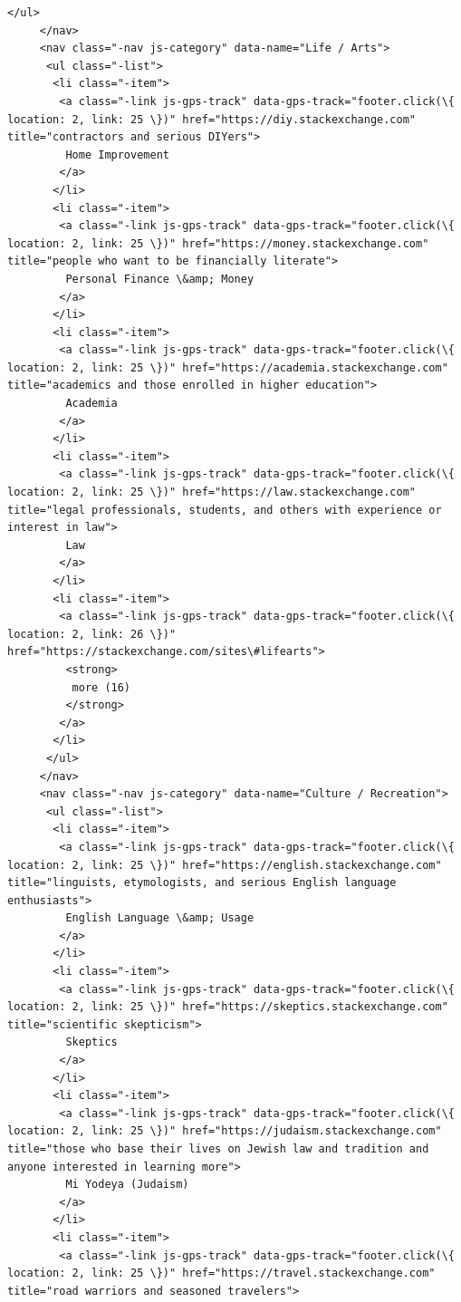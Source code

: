\documentclass[11pt]{article}
\begin{document}
\begin{Verbatim}[commandchars=\\\{\}]
      </ul>
     </nav>
     <nav class="-nav js-category" data-name="Life / Arts">
      <ul class="-list">
       <li class="-item">
        <a class="-link js-gps-track" data-gps-track="footer.click(\{ location: 2, link: 25 \})" href="https://diy.stackexchange.com" title="contractors and serious DIYers">
         Home Improvement
        </a>
       </li>
       <li class="-item">
        <a class="-link js-gps-track" data-gps-track="footer.click(\{ location: 2, link: 25 \})" href="https://money.stackexchange.com" title="people who want to be financially literate">
         Personal Finance \&amp; Money
        </a>
       </li>
       <li class="-item">
        <a class="-link js-gps-track" data-gps-track="footer.click(\{ location: 2, link: 25 \})" href="https://academia.stackexchange.com" title="academics and those enrolled in higher education">
         Academia
        </a>
       </li>
       <li class="-item">
        <a class="-link js-gps-track" data-gps-track="footer.click(\{ location: 2, link: 25 \})" href="https://law.stackexchange.com" title="legal professionals, students, and others with experience or interest in law">
         Law
        </a>
       </li>
       <li class="-item">
        <a class="-link js-gps-track" data-gps-track="footer.click(\{ location: 2, link: 26 \})" href="https://stackexchange.com/sites\#lifearts">
         <strong>
          more (16)
         </strong>
        </a>
       </li>
      </ul>
     </nav>
     <nav class="-nav js-category" data-name="Culture / Recreation">
      <ul class="-list">
       <li class="-item">
        <a class="-link js-gps-track" data-gps-track="footer.click(\{ location: 2, link: 25 \})" href="https://english.stackexchange.com" title="linguists, etymologists, and serious English language enthusiasts">
         English Language \&amp; Usage
        </a>
       </li>
       <li class="-item">
        <a class="-link js-gps-track" data-gps-track="footer.click(\{ location: 2, link: 25 \})" href="https://skeptics.stackexchange.com" title="scientific skepticism">
         Skeptics
        </a>
       </li>
       <li class="-item">
        <a class="-link js-gps-track" data-gps-track="footer.click(\{ location: 2, link: 25 \})" href="https://judaism.stackexchange.com" title="those who base their lives on Jewish law and tradition and anyone interested in learning more">
         Mi Yodeya (Judaism)
        </a>
       </li>
       <li class="-item">
        <a class="-link js-gps-track" data-gps-track="footer.click(\{ location: 2, link: 25 \})" href="https://travel.stackexchange.com" title="road warriors and seasoned travelers">

\end{Verbatim}
\end{document}
